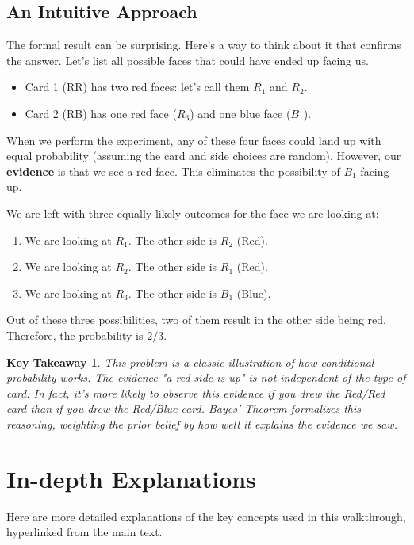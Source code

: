 \documentclass[11pt,a4paper]{article}
\theoremstyle{tutorstyle}
\newtheorem*{takeaway}{Key Takeaway}
\begin{document}
\subsection{An Intuitive Approach}
The formal result can be surprising. Here's a way to think about it that confirms the answer. Let's list all possible faces that could have ended up facing us.
\begin{itemize}
    \item Card 1 (RR) has two red faces: let's call them $R_1$ and $R_2$.
    \item Card 2 (RB) has one red face ($R_3$) and one blue face ($B_1$).
\end{itemize}
When we perform the experiment, any of these four faces could land up with equal probability (assuming the card and side choices are random). However, our \textbf{evidence} is that we see a red face. This eliminates the possibility of $B_1$ facing up.

We are left with three equally likely outcomes for the face we are looking at:
\begin{enumerate}
    \item We are looking at $R_1$. The other side is $R_2$ (Red).
    \item We are looking at $R_2$. The other side is $R_1$ (Red).
    \item We are looking at $R_3$. The other side is $B_1$ (Blue).
\end{enumerate}
Out of these three possibilities, two of them result in the other side being red. Therefore, the probability is $2/3$.

\begin{takeaway}
This problem is a classic illustration of how conditional probability works. The evidence "a red side is up" is not independent of the type of card. In fact, it's \textit{more likely} to observe this evidence if you drew the Red/Red card than if you drew the Red/Blue card. Bayes' Theorem formalizes this reasoning, weighting the prior belief by how well it explains the evidence we saw.
\end{takeaway}

\newpage
\section{In-depth Explanations}

Here are more detailed explanations of the key concepts used in this walkthrough, hyperlinked from the main text.

\end{document}
